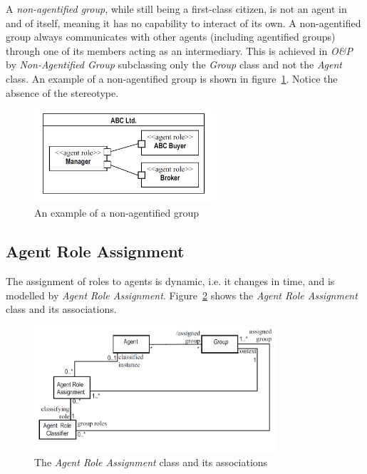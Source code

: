 A \textit{non-agentified group}, while still being a first-class citizen, is not an agent in and of itself, meaning it has no capability to interact of its own.
A non-agentified group always communicates with other agents (including agentified groups) through one of its members acting as an intermediary.
This is achieved in \textit{O\&P} by \textit{Non-Agentified Group} subclassing only the \textit{Group} class and not the \textit{Agent} class.
An example of a non-agentified group is shown in figure~\ref{figure:onp-non-agentified-group}.
Notice the absence of the  stereotype.

\begin{figure}[ht]
	\centering
	\includegraphics[width=0.6\textwidth]{images/onp/non-agentified-group.png}
	\caption{An example of a non-agentified group \cite{Odell05}}
	\label{figure:onp-non-agentified-group}
\end{figure}

\subsection{Agent Role Assignment}

The assignment of roles to agents is dynamic, i.e. it changes in time, and is modelled by \textit{Agent Role Assignment}.
Figure~\ref{figure:onp-agent-role-assignment} shows the \textit{Agent Role Assignment} class and its associations.

\begin{figure}[ht]
	\centering
	\includegraphics[width=0.8\textwidth]{images/onp/agent-role-assignment.png}
	\caption{The \textit{Agent Role Assignment} class and its associations \cite{Odell05}}
	\label{figure:onp-agent-role-assignment}
\end{figure}

